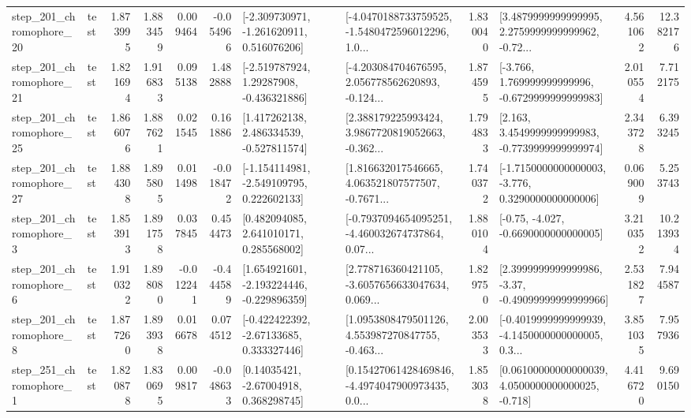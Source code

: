 \begin{tabular}{llrrrrllrlrr}
  step\_201\_chromophore\_20 &      test &      1.873995 &    1.883459 &      0.009464 & -0.054966 &   [-2.309730971, -1.261620911, 0.516076206] &  [-4.0470188733759525, -1.5480472596012296, 1.0... &       1.830040 &  [3.4879999999999995, 2.2759999999999962, -0.72... &            4.561062 &         12.382176 \\
  step\_201\_chromophore\_21 &      test &      1.821694 &    1.916833 &      0.095138 &  1.482888 &    [-2.519787924, 1.29287908, -0.436321886] &  [-4.203084704676595, 2.056778562620893, -0.124... &       1.874595 &   [-3.766, 1.769999999999996, -0.6729999999999983] &            2.010554 &          7.712175 \\
  step\_201\_chromophore\_25 &      test &      1.866076 &    1.887621 &      0.021545 &  0.161886 &    [1.417262138, 2.486334539, -0.527811574] &  [2.388179225993424, 3.9867720819052663, -0.362... &       1.794833 &   [2.163, 3.4549999999999983, -0.7739999999999974] &            2.343728 &          6.393245 \\
  step\_201\_chromophore\_27 &      test &      1.884308 &    1.895805 &      0.011498 & -0.018472 &   [-1.154114981, -2.549109795, 0.222602133] &  [1.816632017546665, 4.063521807577507, -0.7671... &       1.740372 &  [-1.7150000000000003, -3.776, 0.3290000000000006] &            0.069009 &          5.253743 \\
   step\_201\_chromophore\_3 &      test &      1.853913 &    1.891758 &      0.037845 &  0.454473 &     [0.482094085, 2.641010171, 0.285568002] &  [-0.7937094654095251, -4.460032674737864, 0.07... &       1.880104 &               [-0.75, -4.027, -0.6690000000000005] &            3.210352 &         10.213934 \\
   step\_201\_chromophore\_6 &      test &      1.910322 &    1.898080 &     -0.012241 & -0.444589 &   [1.654921601, -2.193224446, -0.229896359] &  [2.778716360421105, -3.6057656633047634, 0.069... &       1.829750 &  [2.3999999999999986, -3.37, -0.49099999999999966] &            2.531827 &          7.944587 \\
   step\_201\_chromophore\_8 &      test &      1.877260 &    1.893938 &      0.016678 &  0.074512 &    [-0.422422392, -2.67133685, 0.333327446] &  [1.0953808479501126, 4.553987270847755, -0.463... &       2.003533 &  [-0.4019999999999939, -4.1450000000000005, 0.3... &            3.851035 &          7.957936 \\
   step\_251\_chromophore\_1 &      test &      1.820878 &    1.830695 &      0.009817 & -0.048633 &      [0.14035421, -2.67004918, 0.368298745] &  [0.15427061428469846, -4.4974047900973435, 0.0... &       1.853038 &  [0.06100000000000039, 4.0500000000000025, -0.718] &            4.416720 &          9.690150 \\

\end{tabular}
